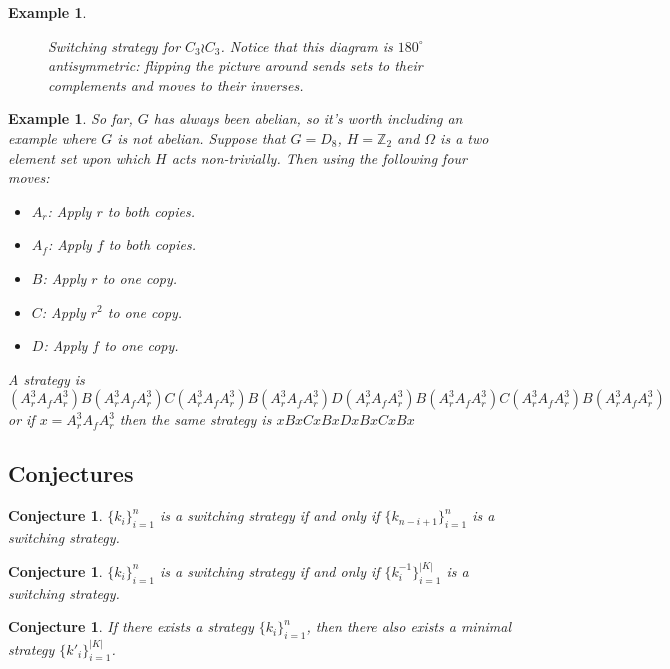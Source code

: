 \documentclass{article}
\newcommand{\s}[1]{\{ #1 \}}
\numberwithin{equation}{subsection}
\newtheorem{conjecture}[theo]{Conjecture}
\newtheorem{example}[theo]{Example}
\begin{document}
\begin{example}
\begin{figure}[ht!]
  \caption{Switching strategy for $C_3 \wr C_3$.
  Notice that this diagram is $180^\circ$ antisymmetric:
  flipping the picture around sends sets to their complements and
  moves to their inverses.}
  \label{fig:c3c3strategygraph}
  \end{figure}
\end{example}

\begin{example}
  So far, $G$ has always been abelian, so it's worth including an example where
  $G$ is not abelian.
  Suppose that $G = D_8$, $H = \mathbb Z_2$ and $\Omega$ is a two element set
  upon which $H$ acts non-trivially. Then using the following four moves: \begin{itemize}
    \item $A_r$: Apply $r$ to both copies.
    \item $A_f$: Apply $f$ to both copies.
    \item $B$: Apply $r$ to one copy.
    \item $C$: Apply $r^2$ to one copy.
    \item $D$: Apply $f$ to one copy.
  \end{itemize}
  A strategy is $(A_r^3A_fA_r^3)B(A_r^3A_fA_r^3)C(A_r^3A_fA_r^3)B(A_r^3A_fA_r^3)D(A_r^3A_fA_r^3)B(A_r^3A_fA_r^3)C(A_r^3A_fA_r^3)B(A_r^3A_fA_r^3)$
  or if $x = A_r^3A_fA_r^3$ then the same strategy is
  $xBxCxBxDxBxCxBx$
\end{example}
\subsection{Conjectures}
\begin{conjecture}
  $\s{k_i}_{i=1}^n$ is a switching strategy if and only if $\s{k_{n-i+1}}_{i=1}^n$ is a switching strategy.
\end{conjecture}
\begin{conjecture}
  $\s{k_i}_{i=1}^n$ is a switching strategy if and only if $\s{k^{-1}_i}_{i=1}^{|K|}$ is a switching strategy.
\end{conjecture}
\begin{conjecture}
  If there exists a strategy $\s{k_i}_{i=1}^n$, then there also exists a minimal strategy $\s{k'_i}_{i=1}^{|K|}$.
\end{conjecture}
\end{document}
